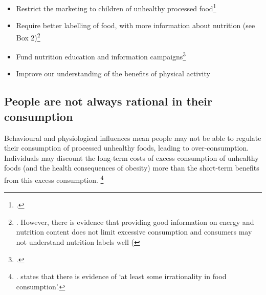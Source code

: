 \documentclass[embargoed]{grattan}
\begin{document}
\begin{itemize}
\item
  Restrict the marketing to children of unhealthy processed food\footcites{Organization2016Reportcommissionending}{Cairns2013Systematicreviewsevidence}{Magnus2009costeffectivenessremoving}{Chou2005Fastfoodrestaurant}{Boyland2011Foodcommercialsincrease}{Capacci2012Policiespromotehealthy}
\item
  Require better labelling of food, with more information about nutrition (see Box 2)\footnote{\textcites{MacKay2011Legislativesolutionsunhealthy}{Freebairn2010Taxationobesity}{Capacci2012Policiespromotehealthy}{Roberto2012Factsfrontversus}{Restrepo2014Calorielabelingchain}{Magnusson2010Obesitypreventionpersonal}{Cowburn2005Consumerunderstandinguse}{Hawley2013sciencefrontpackage}{Mejean2014Associationperceptionfront}.
However, there is evidence that providing good information on energy and nutrition content does not limit excessive consumption and consumers may not understand nutrition labels well (\textcites{Downs2009Strategiespromotinghealthier}{Cowburn2005Consumerunderstandinguse}{Watson2013Howwelldo}}
\item
  Fund nutrition education and information campaigns\footcites{Organization2016Reportcommissionending}{Capacci2012Policiespromotehealthy}{Hawkes2013Promotinghealthydiets}{Pettigrew2013Consumersinabilityestimate}{Liquori1998CookshopProgramoutcome}
\item
  Improve our understanding of the benefits of physical activity
 \end{itemize}

\subsection{People are not always rational in their consumption}\label{people-are-not-always-rational-in-their-consumption}


Behavioural and physiological influences mean people may not be able to regulate their consumption of processed unhealthy foods, leading to over-consumption.
Individuals may discount the long-term costs of excess consumption of unhealthy foods (and the health consequences of obesity) more than the short-term benefits from this excess consumption.%
\footnote{\textcites{CnossenExcisetaxationAustralia}{Cawley2015economyscalesselective}{Gruber2004Taxincidencewhen}. \textcite{Ruhm2012Understandingovereatingobesity} states that there is evidence of `at least some irrationality in food consumption'.}
\end{document}
